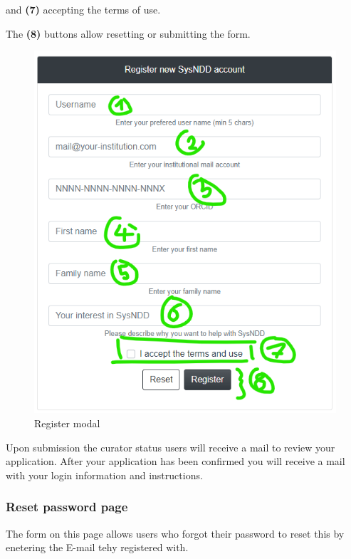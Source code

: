 \documentclass[
]{article}
\begin{document}
and \textbf{(7)} accepting the terms of use.

The \textbf{(8)} buttons allow resetting or submitting the form.

\begin{figure}
\centering
\includegraphics{./static/img/02_17-register-modal.png}
\caption{Register modal}
\end{figure}

Upon submission the curator status users will receive a mail to review your application. After your application has been confirmed you will receive a mail with your login information and instructions.

\hypertarget{reset-password-page}{%
\subsubsection{Reset password page}\label{reset-password-page}}

The form on this page allows users who forgot their password to reset this by enetering the E-mail tehy registered with.
\end{document}
